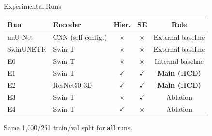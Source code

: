 \documentclass[aspectratio=169]{beamer}
\begin{document}
\begin{frame}{Experimental Runs}
  \vspace{0.5em}
  \begin{center}
  \begin{tabular}{llccc}
    \toprule
    \textbf{Run} & \textbf{Encoder} & \textbf{Hier.} & \textbf{SE} & \textbf{Role} \\
    \midrule
    nnU-Net      & CNN (self-config.) & $\times$     & $\times$     & External baseline \\
    SwinUNETR    & Swin-T             & $\times$     & $\times$     & External baseline \\
    \midrule
    E0           & Swin-T             & $\times$     & $\times$     & Internal baseline \\
    \midrule
    E1           & Swin-T             & $\checkmark$ & $\checkmark$ & \textbf{Main (HCD)} \\
    E2           & ResNet50-3D        & $\checkmark$ & $\checkmark$ & \textbf{Main (HCD)} \\
    \midrule
    E3           & Swin-T             & $\times$     & $\checkmark$ & Ablation \\
    E4           & Swin-T             & $\checkmark$ & $\times$     & Ablation \\
    \bottomrule
  \end{tabular}
  \end{center}

  \vspace{0.5em}
  \begin{center}
    \small Same 1,000/251 train/val split for \textbf{all} runs.
  \end{center}
\end{frame}
\end{document}
